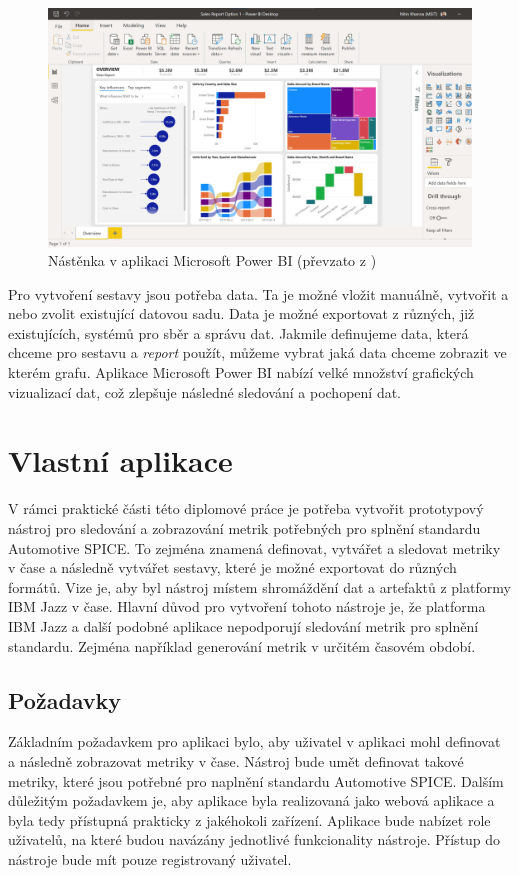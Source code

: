 \documentclass[czech,master,public,dept460,male,cpdeclaration,oneside]{diploma}
\begin{document}
\begin{figure}[!ht]
    \centering
    \includegraphics[width=1\textwidth]{Diplomka/Figures/powerbi-dashboard.jpg}
    \caption{Nástěnka v aplikaci Microsoft Power BI (převzato z \cite{ref:microsoft_bi_general})}
    \label{fig:powerbi_dashboard}
\end{figure}

Pro vytvoření sestavy jsou potřeba data. Ta je možné vložit manuálně, vytvořit a nebo zvolit existující datovou sadu. Data je možné exportovat z různých, již existujících, systémů pro sběr a správu dat. Jakmile definujeme data, která chceme pro sestavu a \textit{report} použít, můžeme vybrat jaká data chceme zobrazit ve kterém grafu. Aplikace Microsoft Power BI nabízí velké množství grafických vizualizací dat, což zlepšuje následné sledování a pochopení dat.


\section{Vlastní aplikace}
V rámci  praktické části této diplomové práce je potřeba vytvořit  prototypový nástroj pro sledování a zobrazování metrik potřebných pro splnění standardu Automotive SPICE. To zejména znamená definovat, vytvářet a sledovat metriky v čase a následně vytvářet sestavy, které je možné exportovat do různých formátů. Vize je, aby byl nástroj místem shromáždění dat a artefaktů z platformy IBM Jazz v čase. Hlavní důvod pro vytvoření tohoto nástroje je, že platforma IBM Jazz a další podobné aplikace nepodporují sledování metrik pro splnění standardu. Zejména například generování metrik v určitém časovém období.

\subsection{Požadavky}
\label{sec:requirements}
Základním požadavkem pro aplikaci bylo, aby uživatel v aplikaci mohl definovat a následně zobrazovat metriky v čase. Nástroj bude umět definovat takové metriky, které jsou potřebné pro naplnění standardu Automotive SPICE. Dalším důležitým požadavkem je, aby aplikace byla realizovaná jako webová aplikace a byla tedy přístupná prakticky z jakéhokoli zařízení. Aplikace bude nabízet role uživatelů, na které budou navázány jednotlivé funkcionality nástroje. Přístup do nástroje bude mít pouze registrovaný uživatel.
\end{document}
